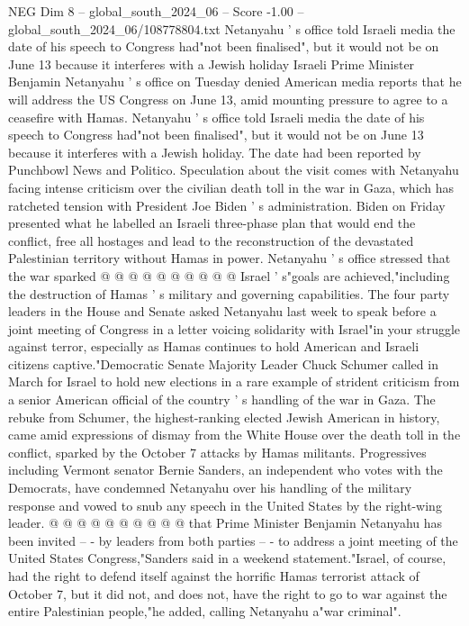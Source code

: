 \begin{textsample}{NEG Dim 8 – global\_south\_2024\_06 – Score -1.00 – global\_south\_2024\_06/108778804.txt}  \label{ex:f8_neg_045}
Netanyahu ' s office told Israeli media the date of his speech to Congress had"not been finalised", but it would not be on June 13 because it interferes with a Jewish holiday Israeli Prime Minister Benjamin Netanyahu ' s office on Tuesday denied American media reports that he will address the US Congress on June 13, amid mounting pressure to agree to a ceasefire with Hamas.
Netanyahu ' s office told Israeli media the date of his speech to Congress had"not been finalised", but it would not be on June 13 because it interferes with a Jewish holiday.
The date had been reported by Punchbowl News and Politico.
Speculation about the visit comes with Netanyahu facing intense criticism over the civilian death toll in the war in Gaza, which has ratcheted tension with President Joe Biden ' s administration.
Biden on Friday presented what he labelled an Israeli three-phase plan that would end the conflict, free all hostages and lead to the reconstruction of the devastated Palestinian territory without Hamas in power.
Netanyahu ' s office stressed that the war sparked @ @ @ @ @ @ @ @ @ @ Israel ' s"goals are achieved,"including the destruction of Hamas ' s military and governing capabilities.
The four party leaders in the House and Senate asked Netanyahu last week to speak before a joint meeting of Congress in a letter voicing solidarity with Israel"in your struggle against terror, especially as Hamas continues to hold American and Israeli citizens captive."Democratic Senate Majority Leader Chuck Schumer called in March for Israel to hold new elections in a rare example of strident criticism from a senior American official of the country ' s handling of the war in Gaza.
The rebuke from Schumer, the highest-ranking elected Jewish American in history, came amid expressions of dismay from the White House over the death toll in the conflict, sparked by the October 7 attacks by Hamas militants.
Progressives including Vermont senator Bernie Sanders, an independent who votes with the Democrats, have condemned Netanyahu over his handling of the military response and vowed to snub any speech in the United States by the right-wing leader. @ @ @ @ @ @ @ @ @ @ that Prime Minister Benjamin Netanyahu has been invited -- - by leaders from both parties -- - to address a joint meeting of the United States Congress,"Sanders said in a weekend statement."Israel, of course, had the right to defend itself against the horrific Hamas terrorist attack of October 7, but it did not, and does not, have the right to go to war against the entire Palestinian people,"he added, calling Netanyahu a"war criminal".

\end{textsample}
